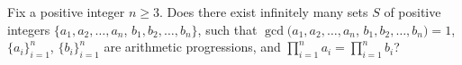 Fix a  positive integer $n\geq 3$. Does there exist infinitely many sets $S$ of positive integers $\lbrace a_1,a_2,\ldots, a_n$, $b_1,b_2,\ldots,b_n\rbrace$, such that $\gcd (a_1,a_2,\ldots, a_n$, $b_1,b_2,\ldots,b_n)=1$, $\lbrace a_i\rbrace _{i=1}^n$, $\lbrace b_i\rbrace _{i=1}^n$ are arithmetic progressions, and $\prod_{i=1}^n a_i = \prod_{i=1}^n b_i$?